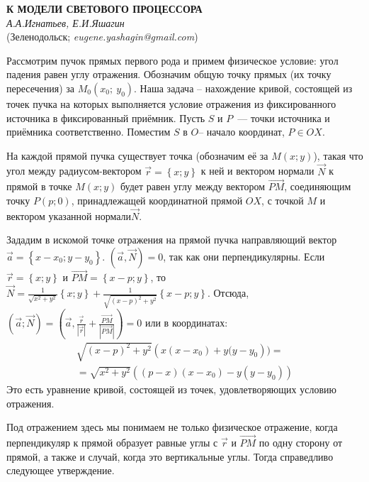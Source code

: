 \begin{center}{ \bf К МОДЕЛИ СВЕТОВОГО ПРОЦЕССОРА}\\
{\it А.А.Игнатьев, Е.И.Яшагин} \\
(Зеленодольск; {\it eugene.yashagin@gmail.com})
\end{center}

Рассмотрим пучок прямых первого рода и примем физическое условие: угол падения равен углу отражения.
Обозначим общую точку прямых (их точку пересечения) за $M_0\left(x_0;\ y_0\right)$.
Наша задача -- нахождение кривой,
состоящей из точек пучка на которых выполняется условие отражения из фиксированного источника в фиксированный приёмник.
Пусть $S$ и $P$~--- точки источника и приёмника соответственно. Поместим $S$ в $O$--  начало координат, $P\in OX$.

На каждой прямой пучка существует точка (обозначим её за $M\left(x;y\right)$), такая что угол между радиусом-вектором $\overrightarrow{r}=\left\{x;y\right\}$ к ней и вектором нормали $\overrightarrow{N}$ к прямой в точке $M\left(x;y\right)$ будет равен углу между вектором $\overrightarrow{PM}$, соединяющим точку $P\left(p;0\right)$, принадлежащей координатной прямой $OX$, с точкой $M$ и вектором указанной нормали$\overrightarrow{N}$.

Зададим в искомой точке отражения на прямой пучка направляющий вектор $\overrightarrow{a}=\left\{x-x_0;y-y_0\right\}$. $\left(\overrightarrow{a},\overrightarrow{N}\right)=0$, так как они перпендикулярны. Если $\overrightarrow{r}=\left\{x;y\right\}$ и $\overrightarrow{PM}=\left\{x-p;y\right\}$, то  $\overrightarrow{N}=\frac{1}{\sqrt{x^2+y^2}}\left\{x;y\right\}+\frac{1}{\sqrt{{\left(x-p\right)}^2+y^2}}\left\{x-p;y\right\}$. Отсюда, $\left(\overrightarrow{a};\overrightarrow{N}\right)=\left(\overrightarrow{a},\frac{\overrightarrow{r}}{\left|\overrightarrow{r}\right|}+\frac{\overrightarrow{PM}}{\left|\overrightarrow{PM}\right|}\right)=0$ или в координатах:
\begin{multline*}
	\sqrt{{\left(x-p\right)}^2+y^2}\left(x(x-x_0)+y(y-y_0\right))=
	\\=
	\sqrt{x^2+y^2}\left(\left(p-x\right)\left(x-x_0\right)-y\left(y-y_0\right)\right)
\end{multline*}
Это есть уравнение кривой, состоящей из точек, удовлетворяющих условию отражения.

Под отражением здесь мы понимаем не только физическое отражение, когда перпендикуляр к прямой образует равные углы с $\overrightarrow{r}$ и $\overrightarrow{PM}$ по одну сторону от прямой, а также и случай, когда это вертикальные углы. Тогда справедливо следующее утверждение.

